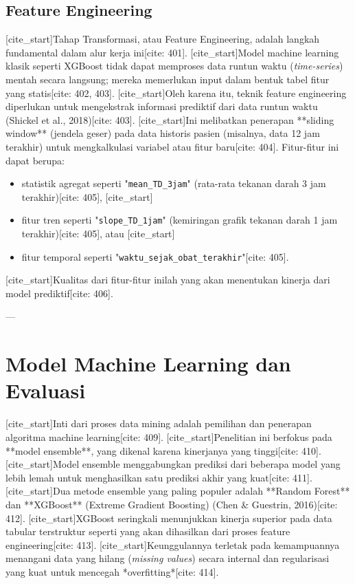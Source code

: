 \subsection{Feature Engineering}
[cite_start]Tahap Transformasi, atau Feature Engineering, adalah langkah fundamental dalam alur kerja ini[cite: 401]. [cite_start]Model machine learning klasik seperti XGBoost tidak dapat memproses data runtun waktu (\textit{time-series}) mentah secara langsung; mereka memerlukan input dalam bentuk tabel fitur yang statis[cite: 402, 403]. [cite_start]Oleh karena itu, teknik feature engineering diperlukan untuk mengekstrak informasi prediktif dari data runtun waktu (Shickel et al., 2018)[cite: 403]. [cite_start]Ini melibatkan penerapan **sliding window** (jendela geser) pada data historis pasien (misalnya, data 12 jam terakhir) untuk mengkalkulasi variabel atau fitur baru[cite: 404]. Fitur-fitur ini dapat berupa:
\begin{itemize}
    [cite_start]\item statistik agregat seperti "\texttt{mean\_TD\_3jam}" (rata-rata tekanan darah 3 jam terakhir)[cite: 405],
    [cite_start]\item fitur tren seperti "\texttt{slope\_TD\_1jam}" (kemiringan grafik tekanan darah 1 jam terakhir)[cite: 405], atau
    [cite_start]\item fitur temporal seperti "\texttt{waktu\_sejak\_obat\_terakhir}"[cite: 405].
\end{itemize}
[cite_start]Kualitas dari fitur-fitur inilah yang akan menentukan kinerja dari model prediktif[cite: 406].

---
\section{Model Machine Learning dan Evaluasi}
[cite_start]Inti dari proses data mining adalah pemilihan dan penerapan algoritma machine learning[cite: 409]. [cite_start]Penelitian ini berfokus pada **model ensemble**, yang dikenal karena kinerjanya yang tinggi[cite: 410]. [cite_start]Model ensemble menggabungkan prediksi dari beberapa model yang lebih lemah untuk menghasilkan satu prediksi akhir yang kuat[cite: 411]. [cite_start]Dua metode ensemble yang paling populer adalah **Random Forest** dan **XGBoost** (Extreme Gradient Boosting) (Chen \& Guestrin, 2016)[cite: 412]. [cite_start]XGBoost seringkali menunjukkan kinerja superior pada data tabular terstruktur seperti yang akan dihasilkan dari proses feature engineering[cite: 413]. [cite_start]Keunggulannya terletak pada kemampuannya menangani data yang hilang (\textit{missing values}) secara internal dan regularisasi yang kuat untuk mencegah *overfitting*[cite: 414].

